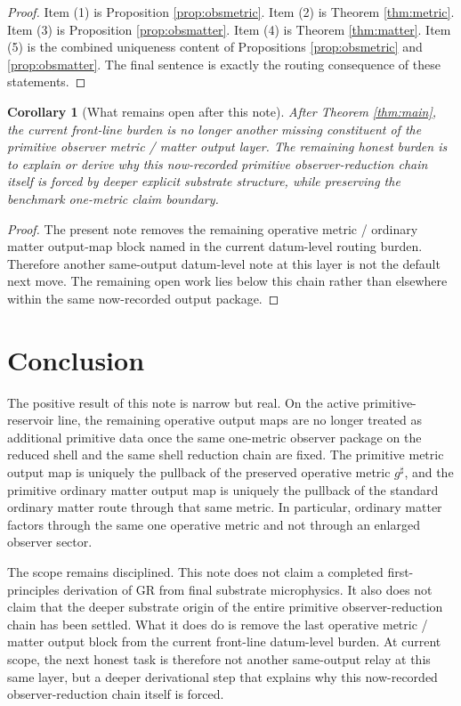 \documentclass[11pt]{article}
\newcommand{\CompletedMetric}{g^{\sharp}}
\newtheorem{corollary}{Corollary}
\begin{document}
\begin{proof}
Item (1) is Proposition \ref{prop:obsmetric}. Item (2) is Theorem \ref{thm:metric}. Item (3) is Proposition \ref{prop:obsmatter}. Item (4) is Theorem \ref{thm:matter}. Item (5) is the combined uniqueness content of Propositions \ref{prop:obsmetric} and \ref{prop:obsmatter}. The final sentence is exactly the routing consequence of these statements.
\end{proof}

\begin{corollary}[What remains open after this note]
\label{cor:next}
After Theorem \ref{thm:main}, the current front-line burden is no longer another missing constituent of the primitive observer metric / matter output layer. The remaining honest burden is to explain or derive why this now-recorded primitive observer-reduction chain itself is forced by deeper explicit substrate structure, while preserving the benchmark one-metric claim boundary.
\end{corollary}

\begin{proof}
The present note removes the remaining operative metric / ordinary matter output-map block named in the current datum-level routing burden. Therefore another same-output datum-level note at this layer is not the default next move. The remaining open work lies below this chain rather than elsewhere within the same now-recorded output package.
\end{proof}

\section{Conclusion}

The positive result of this note is narrow but real. On the active primitive-reservoir line, the remaining operative output maps are no longer treated as additional primitive data once the same one-metric observer package on the reduced shell and the same shell reduction chain are fixed. The primitive metric output map is uniquely the pullback of the preserved operative metric \(\CompletedMetric\), and the primitive ordinary matter output map is uniquely the pullback of the standard ordinary matter route through that same metric. In particular, ordinary matter factors through the same one operative metric and not through an enlarged observer sector.

The scope remains disciplined. This note does not claim a completed first-principles derivation of GR from final substrate microphysics. It also does not claim that the deeper substrate origin of the entire primitive observer-reduction chain has been settled. What it does do is remove the last operative metric / matter output block from the current front-line datum-level burden. At current scope, the next honest task is therefore not another same-output relay at this same layer, but a deeper derivational step that explains why this now-recorded observer-reduction chain itself is forced.
\end{document}
